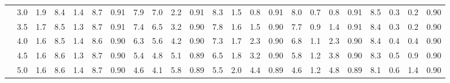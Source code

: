 \begin{table}
{\begin{tabular}{lc|cc|ccc|cccc|cccc|cccc|cccc}
 & 3.0 & 1.9 & 8.4 & 1.4 & 8.7 & 0.91 & 7.9 & 7.0 & 2.2 & 0.91 & 8.3 & 1.5 & 0.8 & 0.91 & 8.0 & 0.7 & 0.8 & 0.91 & 8.5 & 0.3 & 0.2 & 0.90 \\
 & 3.5 & 1.7 & 8.5 & 1.3 & 8.7 & 0.91 & 7.4 & 6.5 & 3.2 & 0.90 & 7.8 & 1.6 & 1.5 & 0.90 & 7.7 & 0.9 & 1.4 & 0.91 & 8.4 & 0.3 & 0.2 & 0.90 \\
 & 4.0 & 1.6 & 8.5 & 1.4 & 8.6 & 0.90 & 6.3 & 5.6 & 4.2 & 0.90 & 7.3 & 1.7 & 2.3 & 0.90 & 6.8 & 1.1 & 2.3 & 0.90 & 8.4 & 0.4 & 0.4 & 0.90 \\
 & 4.5 & 1.6 & 8.6 & 1.3 & 8.7 & 0.90 & 5.4 & 4.8 & 5.1 & 0.89 & 6.5 & 1.8 & 3.2 & 0.90 & 5.8 & 1.2 & 3.8 & 0.90 & 8.3 & 0.5 & 0.9 & 0.90 \\
 & 5.0 & 1.6 & 8.6 & 1.4 & 8.7 & 0.90 & 4.6 & 4.1 & 5.8 & 0.89 & 5.5 & 2.0 & 4.4 & 0.89 & 4.6 & 1.2 & 4.8 & 0.89 & 8.1 & 0.6 & 1.4 & 0.90 \\
\bottomrule
\end{tabular}}
\end{table}

